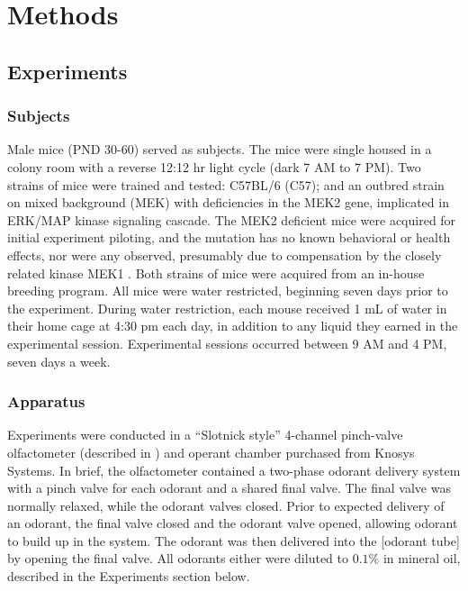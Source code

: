 \section{Methods}

\subsection{Experiments}

\subsubsection{Subjects}
Male mice (PND 30-60) served as subjects. The mice were single housed in a colony room with a reverse 12:12 hr light cycle (dark 7 AM to 7 PM). Two strains of mice were trained and tested: C57BL/6 (C57); and an outbred strain on mixed background (MEK) with deficiencies in the MEK2 gene, implicated in ERK/MAP kinase signaling cascade. The MEK2 deficient mice were acquired for initial experiment piloting, and the mutation has no known behavioral or health effects, nor were any observed, presumably due to compensation by the closely related kinase MEK1 \cite{12832465}. Both strains of mice were acquired from an in-house breeding program. All mice were water restricted, beginning seven days prior to the experiment. During water restriction, each mouse received 1 mL of water in their home cage at 4:30 pm each day, in addition to any liquid they earned in the experimental session. Experimental sessions occurred between 9 AM and 4 PM, seven days a week.

\subsubsection{Apparatus}
Experiments were conducted in a ``Slotnick style'' 4-channel pinch-valve olfactometer (described in \cite{18428626}) and operant chamber purchased from Knosys Systems. In brief, the olfactometer contained a two-phase odorant delivery system with a pinch valve for each odorant and a shared final valve. The final valve was normally relaxed, while the odorant valves closed. Prior to expected delivery of an odorant, the final valve closed and the odorant valve opened, allowing odorant to build up in the system. The odorant was then delivered into the [odorant tube] by opening the final valve. All odorants either were diluted to $0.1\%$ in mineral oil, described in the Experiments section below.

